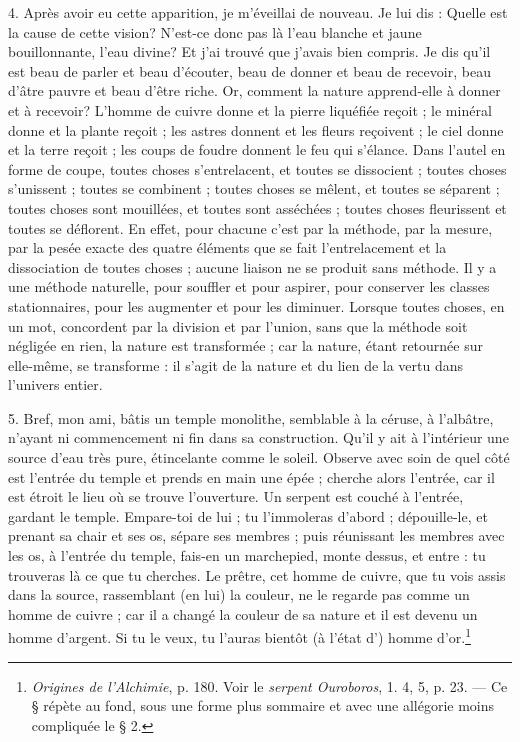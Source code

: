 \documentclass[a4paper, 11pt, oneside, polutonikogreek, french]{article}
\begin{document}
4. Après avoir eu cette apparition, je m'éveillai de nouveau. Je lui dis : Quelle est la cause de cette vision? N'est-ce donc pas là l'eau blanche et jaune bouillonnante, l'eau divine? Et j'ai trouvé que j'avais bien compris. Je dis qu'il est beau de parler et beau d'écouter, beau de donner et beau de recevoir, beau d'âtre pauvre et beau d'être riche. Or, comment la nature apprend-elle à donner et à recevoir? L'homme de cuivre donne et la pierre liquéfiée reçoit ; le minéral donne et la plante reçoit ; les astres donnent et les fleurs reçoivent ; le ciel donne et la terre reçoit ; les coups de foudre donnent le feu qui s'élance. Dans l'autel en forme de coupe, toutes choses s'entrelacent, et toutes se dissocient ; toutes choses s'unissent ; toutes se combinent ; toutes choses se mêlent, et toutes se séparent ; toutes choses sont mouillées, et toutes sont asséchées ; toutes choses fleurissent et toutes se déflorent. En effet, pour chacune c'est par la méthode, par la mesure, par la pesée exacte des quatre éléments que se fait l'entrelacement et la dissociation de toutes choses ; aucune liaison ne se produit sans méthode. Il y a une méthode naturelle, pour souffler et pour aspirer, pour conserver les classes stationnaires, pour les augmenter et pour les diminuer. Lorsque toutes choses, en un mot, concordent par la division et par l'union, sans que la méthode soit négligée en rien, la nature est transformée ; car la nature, étant retournée sur elle-même, se transforme : il s'agit de la nature et du lien de la vertu dans l'univers entier.

5. Bref, mon ami, bâtis un temple monolithe, semblable à la céruse, à l'albâtre, n'ayant ni commencement ni fin dans sa construction. Qu'il y ait à l'intérieur une source d'eau très pure, étincelante comme le soleil. Observe avec soin de quel côté est l'entrée du temple et prends en main une épée ; cherche alors l'entrée, car il est étroit le lieu où se trouve l'ouverture. Un serpent est couché à l'entrée, gardant le temple. Empare-toi de lui ; tu l'immoleras d'abord ; dépouille-le, et prenant sa chair et ses os, sépare ses membres ; puis réunissant les membres avec les os, à l'entrée du temple, fais-en un marchepied, monte dessus, et entre : tu trouveras là ce que tu cherches. Le prêtre, cet homme de cuivre, que tu vois assis dans la source, rassemblant (en lui) la couleur, ne le regarde pas comme un homme de cuivre ; car il a changé la couleur de sa nature et il est devenu un homme d'argent. Si tu le veux, tu l'auras bientôt (à l'état d') homme d'or.\footnote{\emph{Origines de l'Alchimie}, p. 180. Voir le \emph{serpent Ouroboros}, 1. 4, 5, p. 23. --- Ce § répète au fond, sous une forme plus sommaire et avec une allégorie moins compliquée le § 2.}
\end{document}
